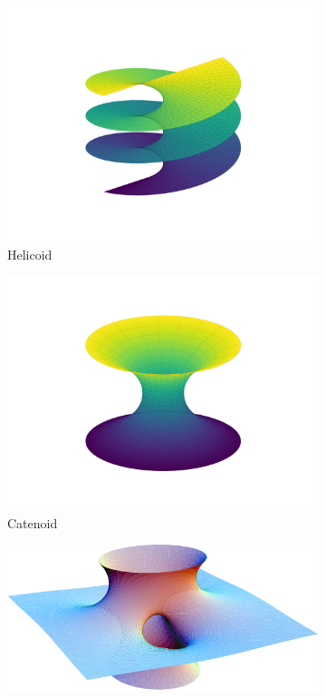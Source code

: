 \begin{figure}
\centering
\begin{subfigure}{0.45\textwidth}
    \centering
    \includegraphics[width=\textwidth]{picture/week4/helicoid.pdf}
    \caption{Helicoid}
\end{subfigure}
\begin{subfigure}{0.45\textwidth}
    \centering
    \includegraphics[width=\textwidth]{picture/week4/catenoid.pdf}
    \caption{Catenoid}
\end{subfigure}
\begin{subfigure}{0.5\textwidth}
    \centering
    \includegraphics[width=\textwidth]{picture/week4/costa.pdf}

\end{subfigure}
\end{figure}
